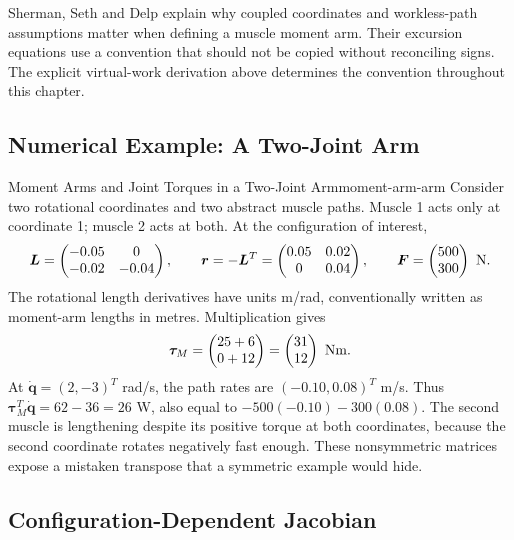 Sherman, Seth and Delp explain why coupled coordinates and workless-path assumptions matter when defining a muscle moment arm. \citep{Sherman2013MomentArm} Their excursion equations use a convention that should not be copied without reconciling signs. The explicit virtual-work derivation above determines the convention throughout this chapter.

\subsection{Numerical Example: A Two-Joint Arm}

\begin{example}[colbacktitle=black!65]{Moment Arms and Joint Torques in a Two-Joint Arm}{moment-arm-arm}
Consider two rotational coordinates and two abstract muscle paths. Muscle 1 acts only at coordinate 1; muscle 2 acts at both. At the configuration of interest,
\[
\bm L=\begin{pmatrix}-0.05&0\\-0.02&-0.04\end{pmatrix},\qquad
\bm r=-\bm L^T=\begin{pmatrix}0.05&0.02\\0&0.04\end{pmatrix},\qquad
\bm F=\begin{pmatrix}500\\300\end{pmatrix}\ {\rm N}.
\]
The rotational length derivatives have units m/rad, conventionally written as moment-arm lengths in metres. Multiplication gives
\[
\bm\tau_M=\begin{pmatrix}25+6\\0+12\end{pmatrix}
=\begin{pmatrix}31\\12\end{pmatrix}\ {\rm Nm}.
\]
At $\dot{\bm q}=(2,-3)^T$ rad/s, the path rates are $(-0.10,0.08)^T$ m/s. Thus $\bm\tau_M^T\dot{\bm q}=62-36=26$ W, also equal to $-500(-0.10)-300(0.08)$. The second muscle is lengthening despite its positive torque at both coordinates, because the second coordinate rotates negatively fast enough. These nonsymmetric matrices expose a mistaken transpose that a symmetric example would hide.
\end{example}

\subsection{Configuration-Dependent Jacobian}

